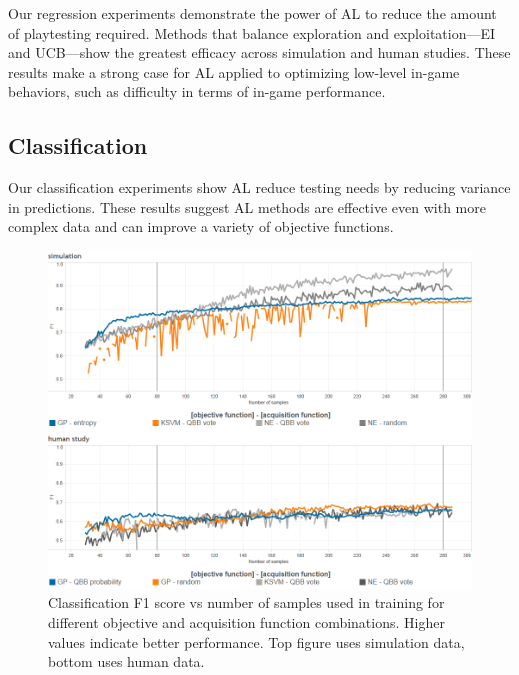 \documentclass{sig-alternate}
\begin{document}
Our regression experiments demonstrate the power of AL to reduce the amount of playtesting required.
Methods that balance exploration and exploitation---EI and UCB---show the greatest efficacy across simulation and human studies.
These results make a strong case for AL applied to optimizing low-level in-game behaviors, such as difficulty in terms of in-game performance.


\subsection{Classification}
Our classification experiments show AL reduce testing needs by reducing variance in predictions.
These results suggest AL methods are effective even with more complex data and can improve a variety of objective functions.


\begin{figure}[tbph]
\centering
\includegraphics[width=\linewidth]{classification_results}
\caption{Classification F1 score vs number of samples used in training for different objective and acquisition function combinations. Higher values indicate better performance. Top figure uses simulation data, bottom uses human data.}
\label{fig:cls_all}
\end{figure}
\end{document}
